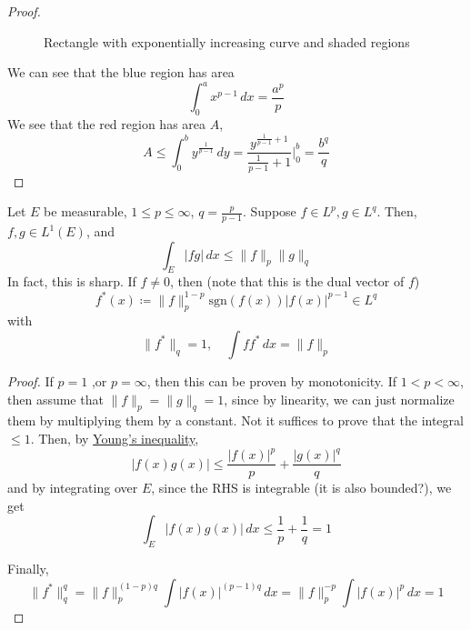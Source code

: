 \begin{proof}
\begin{figure}[H]
      \caption{Rectangle with exponentially increasing curve and shaded regions}
      \label{fig:rectangle}
    \end{figure}

    We can see that the blue region has area 
    \begin{equation}
      \int_0^a x^{p-1} \,dx = \frac{a^p}{p} 
    \end{equation}
    We see that the red region has area $A$, 
    \begin{equation}
      A \leq \int_0^b y^{\frac{1}{p-1}} \,dy = \frac{y^{\frac{1}{p-1} + 1}}{\frac{1}{p-1} + 1} \bigg|_0^b = \frac{b^q}{q} 
    \end{equation}
  \end{proof}

  \begin{lemma}[Holder]
    \label{thm:holder}
    Let $E$ be measurable, $1 \leq p \leq \infty$, $q = \frac{p}{p-1}$. Suppose $f \in L^p, g \in L^q$. Then, $f, g \in L^1 (E)$, and 
    \begin{equation}
      \int_E |fg| \,dx \leq \|f\|_p \|g\|_q
    \end{equation}
    In fact, this is sharp. If $f \neq 0$, then (note that this is the dual vector of $f$)
    \begin{equation}
      f^\ast (x) \coloneqq \|f\|_p^{1 - p} \mathrm{sgn}(f(x)) |f(x)|^{p-1} \in L^q
    \end{equation}
    with 
    \begin{equation}
      \|f^\ast \|_q = 1, \quad \int f f^\ast \,dx = \|f\|_p
    \end{equation}
  \end{lemma}
  \begin{proof}
    If $p =1$ ,or $p = \infty$, then this can be proven by monotonicity. If $1 < p < \infty$, then assume that $\|f\|_p = \|g\|_q = 1$, since by linearity, we can just normalize them by multiplying them by a constant. Not it suffices to prove that the integral $\leq 1$. Then, by \hyperref[thm:youngs-inequality]{Young's inequality},
    \begin{equation}
      |f(x) g(x)| \leq \frac{|f(x)|^p}{p} + \frac{|g(x)|^q}{q}
    \end{equation}
    and by integrating over $E$, since the RHS is integrable (it is also bounded?), we get 
    \begin{equation}
      \int_E |f(x) g(x)| \,dx \leq \frac{1}{p} + \frac{1}{q} = 1
    \end{equation}

    Finally, 
    \begin{equation}
      \|f^\ast\|_q^q = \|f\|_p^{(1-p) q} \int |f(x)|^{(p-1)q} \,dx = \|f\|_p^{-p} \int |f(x)|^p \,dx = 1
    \end{equation}
  \end{proof}

